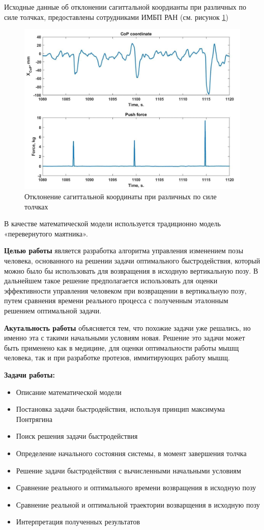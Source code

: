 \documentclass[a4paper,12pt, openany]{book}
\theoremstyle{plain} %
\theoremstyle{definition} %
\theoremstyle{remark} %
\numberwithin{equation}{chapter}
\begin{document}
{Исходные данные об отклонении сагиттальной коордианты при различных по силе толчках, предоставлены сотрудниками ИМБП РАН (см. рисунок \ref{fig:pushes})
\begin{figure}[h!]
    \centering
    \includegraphics[width=0.9\linewidth]{Pushes.png}
    \caption{Отклонение сагиттальной координаты при различных по силе толчках}
    \label{fig:pushes}
\end{figure}
В качестве математической модели
используется традиционно модель «перевернутого маятника»\cite{PAKrychinin,kasatkin,gurfincel}.


\textbf{Целью работы} является разработка алгоритма управления изменением позы человека, основанного на решении задачи оптимального быстродействия,
который можно было бы использовать для возвращения в исходную вертикальную позу. В дальнейшем
такое решение предполагается использовать для оценки эффективности управления человеком
при возвращении в вертикальную позу, путем сравнения
времени реального процесса с полученным эталонным решением оптимальной задачи.

\textbf{Акутальность работы} объясняется тем, что похожие задачи уже решались, но именно эта с такими начальными условиям новая.
Решение это задачи может быть применено как в медицине, для оценки оптимальности работы мышщ человека, так и при разработке протезов, иммитирующих работу мышщ.

\textbf{Задачи работы: }
\begin{itemize}
    \item Описание математической модели
    \item Постановка задачи быстродействия, используя принцип максимума Понтрягина
    \item Поиск решения задачи быстродействия
    \item Определение начального состояния системы, в момент завершения толчка
    \item Решение задачи быстродействия с вычисленными начальными условиям
    \item Сравнение реального и оптимального времени возвращения в исходную позу
    \item Сравнение реальной и оптимальной траектории возварщения в исходную позу
    \item Интерпретация полученных результатов
\end{itemize}

}
\end{document}
